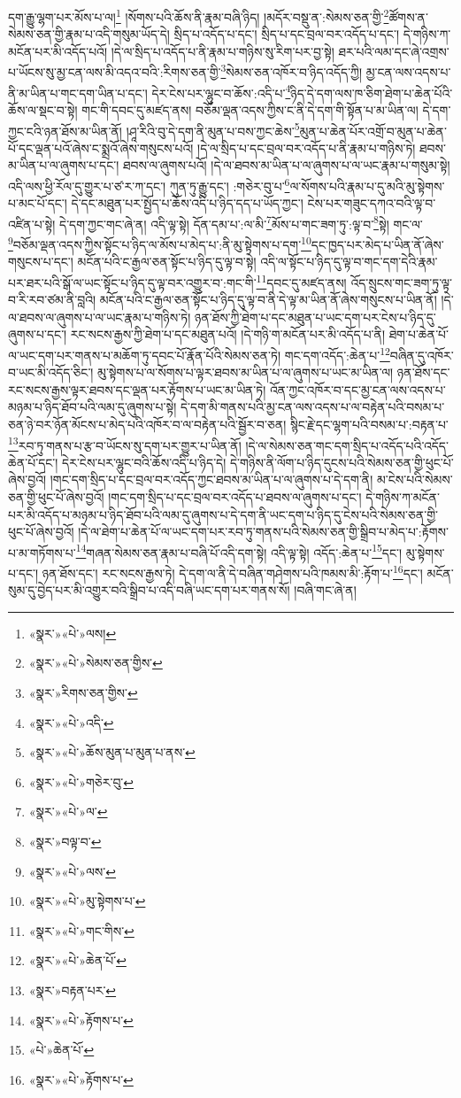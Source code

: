 དག་རྒྱུ་ལྷག་པར་མོས་པ་ལ།\footnote{«སྣར་»«པེ་»ལས།} །སོགས་པའི་ཆོས་ནི་རྣམ་བཞི་ཉིད། །མདོར་བསྡུ་ན་:སེམས་ཅན་གྱི་\footnote{«སྣར་»«པེ་»སེམས་ཅན་གྱིས་}ཚོགས་ན་སེམས་ཅན་གྱི་རྣམ་པ་འདི་གསུམ་ཡོད་དེ། སྲིད་པ་འདོད་པ་དང་། སྲིད་པ་དང་བྲལ་བར་འདོད་པ་དང་། དེ་གཉིས་ཀ་མངོན་པར་མི་འདོད་པའོ། །དེ་ལ་སྲིད་པ་འདོད་པ་ནི་རྣམ་པ་གཉིས་སུ་རིག་པར་བྱ་སྟེ། ཐར་པའི་ལམ་དང་ཞེ་འགྲས་པ་ཡོངས་སུ་མྱ་ངན་ལས་མི་འདའ་བའི་:རིགས་ཅན་གྱི་\footnote{«སྣར་»རིགས་ཅན་གྱིས་}སེམས་ཅན་འཁོར་བ་ཉིད་འདོད་ཀྱི། མྱ་ངན་ལས་འདས་པ་ནི་མ་ཡིན་པ་གང་དག་ཡིན་པ་དང་། དེར་ངེས་པར་ལྷུང་བ་ཆོས་:འདི་པ་\footnote{«སྣར་»«པེ་»འདི་}ཉིད་དེ་དག་ལས་ཁ་ཅིག་ཐེག་པ་ཆེན་པོའི་ཆོས་ལ་སྡང་བ་སྟེ། གང་གི་དབང་དུ་མཛད་ནས། བཅོམ་ལྡན་འདས་ཀྱིས་ང་ནི་དེ་དག་གི་སྟོན་པ་མ་ཡིན་ལ། དེ་དག་ཀྱང་ངའི་ཉན་ཐོས་མ་ཡིན་ནོ། །ཤཱ་རིའི་བུ་དེ་དག་ནི་མུན་པ་བས་ཀྱང་ཆེས་\footnote{«སྣར་»«པེ་»ཆོས་མུན་པ་མུན་པ་ནས་}མུན་པ་ཆེན་པོར་འགྲོ་བ་མུན་པ་ཆེན་པོ་དང་ལྡན་པའོ་ཞེས་ང་སྨྲའོ་ཞེས་གསུངས་པའོ། །དེ་ལ་སྲིད་པ་དང་བྲལ་བར་འདོད་པ་ནི་རྣམ་པ་གཉིས་ཏེ། ཐབས་མ་ཡིན་པ་ལ་ཞུགས་པ་དང་། ཐབས་ལ་ཞུགས་པའོ། །དེ་ལ་ཐབས་མ་ཡིན་པ་ལ་ཞུགས་པ་ལ་ཡང་རྣམ་པ་གསུམ་སྟེ། འདི་ལས་ཕྱི་རོལ་དུ་གྱུར་པ་ཙ་ར་ཀ་དང་། ཀུན་ཏུ་རྒྱུ་དང་། :གཅེར་བུ་པ་\footnote{«སྣར་»«པེ་»གཅེར་བུ་}ལ་སོགས་པའི་རྣམ་པ་དུ་མའི་མུ་སྟེགས་པ་མང་པོ་དང་། དེ་དང་མཐུན་པར་སྤྱོད་པ་ཆོས་འདི་པ་ཉིད་དད་པ་ཡོད་ཀྱང་། ངེས་པར་གཟུང་དཀའ་བའི་ལྟ་བ་འཛིན་པ་སྟེ། དེ་དག་ཀྱང་གང་ཞེ་ན། འདི་ལྟ་སྟེ། དོན་དམ་པ་:ལ་མི་\footnote{«སྣར་»«པེ་»ལ་}མོས་པ་གང་ཟག་ཏུ་:ལྟ་བ་\footnote{«སྣར་»བལྟ་བ་}སྟེ། གང་ལ་\footnote{«སྣར་»«པེ་»ལས་}བཅོམ་ལྡན་འདས་ཀྱིས་སྟོང་པ་ཉིད་ལ་མོས་པ་མེད་པ་:ནི་མུ་སྟེགས་པ་དག་\footnote{«སྣར་»«པེ་»མུ་སྟེགས་པ་}དང་ཁྱད་པར་མེད་པ་ཡིན་ནོ་ཞེས་གསུངས་པ་དང་། མངོན་པའི་ང་རྒྱལ་ཅན་སྟོང་པ་ཉིད་དུ་ལྟ་བ་སྟེ། འདི་ལ་སྟོང་པ་ཉིད་དུ་ལྟ་བ་གང་དག་དེའི་རྣམ་པར་ཐར་པའི་སྒོ་ལ་ཡང་སྟོང་པ་ཉིད་དུ་ལྟ་བར་འགྱུར་བ་:གང་གི་\footnote{«སྣར་»«པེ་»གང་གིས་}དབང་དུ་མཛད་ནས། འོད་སྲུངས་གང་ཟག་ཏུ་ལྟ་བ་རི་རབ་ཙམ་ནི་བླའི། མངོན་པའི་ང་རྒྱལ་ཅན་སྟོང་པ་ཉིད་དུ་ལྟ་བ་ནི་དེ་ལྟ་མ་ཡིན་ནོ་ཞེས་གསུངས་པ་ཡིན་ནོ། །དེ་ལ་ཐབས་ལ་ཞུགས་པ་ལ་ཡང་རྣམ་པ་གཉིས་ཏེ། ཉན་ཐོས་ཀྱི་ཐེག་པ་དང་མཐུན་པ་ཡང་དག་པར་ངེས་པ་ཉིད་དུ་ཞུགས་པ་དང་། རང་སངས་རྒྱས་ཀྱི་ཐེག་པ་དང་མཐུན་པའོ། །དེ་གཉི་ག་མངོན་པར་མི་འདོད་པ་ནི། ཐེག་པ་ཆེན་པོ་ལ་ཡང་དག་པར་གནས་པ་མཆོག་ཏུ་དབང་པོ་རྣོན་པོའི་སེམས་ཅན་ཏེ། གང་དག་འདོད་:ཆེན་པ་\footnote{«སྣར་»«པེ་»ཆེན་པོ་}བཞིན་དུ་འཁོར་བ་ཡང་མི་འདོད་ཅིང་། མུ་སྟེགས་པ་ལ་སོགས་པ་ལྟར་ཐབས་མ་ཡིན་པ་ལ་ཞུགས་པ་ཡང་མ་ཡིན་ལ། ཉན་ཐོས་དང་རང་སངས་རྒྱས་ལྟར་ཐབས་དང་ལྡན་པར་རྟོགས་པ་ཡང་མ་ཡིན་ཏེ། འོན་ཀྱང་འཁོར་བ་དང་མྱ་ངན་ལས་འདས་པ་མཉམ་པ་ཉིད་ཐོབ་པའི་ལམ་དུ་ཞུགས་པ་སྟེ། དེ་དག་མི་གནས་པའི་མྱ་ངན་ལས་འདས་པ་ལ་བརྟེན་པའི་བསམ་པ་ཅན་ཉེ་བར་ཉོན་མོངས་པ་མེད་པའི་འཁོར་བ་ལ་བརྟེན་པའི་སྦྱོར་བ་ཅན། སྙིང་རྗེ་དང་ལྷག་པའི་བསམ་པ་:བརྟན་པ་\footnote{«སྣར་»བརྟན་པར་}རབ་ཏུ་གནས་པ་རྩ་བ་ཡོངས་སུ་དག་པར་གྱུར་པ་ཡིན་ནོ། །དེ་ལ་སེམས་ཅན་གང་དག་སྲིད་པ་འདོད་པའི་འདོད་ཆེན་པོ་དང་། དེར་ངེས་པར་ལྷུང་བའི་ཆོས་འདི་པ་ཉིད་དེ། དེ་གཉིས་ནི་ལོག་པ་ཉིད་དུངས་པའི་སེམས་ཅན་གྱི་ཕུང་པོ་ཞེས་བྱའོ། །གང་དག་སྲིད་པ་དང་བྲལ་བར་འདོད་ཀྱང་ཐབས་མ་ཡིན་པ་ལ་ཞུགས་པ་དེ་དག་ནི། མ་ངེས་པའི་སེམས་ཅན་གྱི་ཕུང་པོ་ཞེས་བྱའོ། །གང་དག་སྲིད་པ་དང་བྲལ་བར་འདོད་པ་ཐབས་ལ་ཞུགས་པ་དང་། དེ་གཉིས་ཀ་མངོན་པར་མི་འདོད་པ་མཉམ་པ་ཉིད་ཐོབ་པའི་ལམ་དུ་ཞུགས་པ་དེ་དག་ནི་ཡང་དག་པ་ཉིད་དུ་ངེས་པའི་སེམས་ཅན་གྱི་ཕུང་པོ་ཞེས་བྱའོ། །དེ་ལ་ཐེག་པ་ཆེན་པོ་ལ་ཡང་དག་པར་རབ་ཏུ་གནས་པའི་སེམས་ཅན་གྱི་སྒྲིབ་པ་མེད་པ་:རྟོགས་པ་མ་གཏོགས་པ་\footnote{«སྣར་»«པེ་»རྟོགས་པ་}གཞན་སེམས་ཅན་རྣམ་པ་བཞི་པོ་འདི་དག་སྟེ། འདི་ལྟ་སྟེ། འདོད་:ཆེན་པ་\footnote{«པེ་»ཆེན་པོ་}དང་། མུ་སྟེགས་པ་དང་། ཉན་ཐོས་དང་། རང་སངས་རྒྱས་ཏེ། དེ་དག་ལ་ནི་དེ་བཞིན་གཤེགས་པའི་ཁམས་མི་:རྟོག་པ་\footnote{«སྣར་»«པེ་»རྟོགས་པ་}དང་། མངོན་སུམ་དུ་བྱེད་པར་མི་འགྱུར་བའི་སྒྲིབ་པ་འདི་བཞི་ཡང་དག་པར་གནས་སོ། །བཞི་གང་ཞེ་ན། 